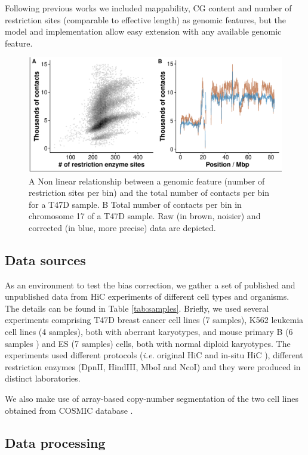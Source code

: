 \documentclass{bioinfo}
\begin{document}
\begin{methods}
Following  previous works \citep{yaffe2011probabilistic,hu2012hicnorm} we included mappability, CG content and number of restriction sites (comparable to effective length) as genomic features, but the model and implementation allow easy extension with any available genomic feature.

\begin{figure}[!tpb]
	\centerline{\includegraphics[width=.45\textwidth]{img/figure1.pdf}}
	\caption{
		A Non linear relationship between a genomic feature (number of restriction sites per bin) and the total number of contacts per bin for a T47D sample. B Total number of contacts per bin in chromosome 17 of a T47D sample. Raw (in brown, noisier) and corrected (in blue, more precise) data are depicted.
	}\label{fig:totals}
\end{figure}

\subsection{Data sources}

As an environment to test the bias correction, we gather a set of published \citep{ledily2014distinct,encode2012integrated,rao20143d,stadhouders2017transcription,lin2012global,dixon2012topological} and unpublished data from HiC experiments of different cell types and organisms. The details can be found in Table \ref{tab:samples}. Briefly, we used several experiments comprising T47D breast cancer cell lines (7 samples), K562 leukemia cell lines (4 samples), both with aberrant karyotypes, and mouse primary B (6 samples ) and ES (7 samples) cells, both with normal diploid karyotypes. The experiments used different protocols (\textit{i.e.} original HiC \citep{lieberman2009comprehensive} and in-situ HiC \citep{rao20143d}), different restriction enzymes (DpnII, HindIII, MboI and NcoI) and they were produced in distinct laboratories.

We also make use of array-based copy-number segmentation of the two cell lines obtained from COSMIC database \citep{forbes2010cosmic}.

\subsection{Data processing}


\end{methods}
\end{document}
